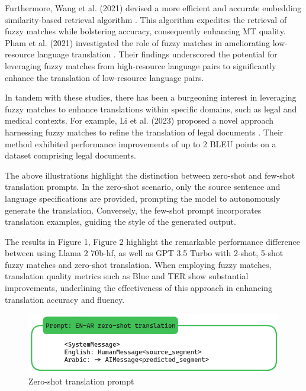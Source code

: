 \documentclass[twocolumn]{article}
\begin{document}
Furthermore, Wang et al. (2021) devised a more efficient and accurate embedding similarity-based retrieval algorithm \cite{wang2021more}. This algorithm expedites the retrieval of fuzzy matches while bolstering accuracy, consequently enhancing MT quality. Pham et al. (2021) investigated the role of fuzzy matches in ameliorating low-resource language translation \cite{pham2021fuzzy}. Their findings underscored the potential for leveraging fuzzy matches from high-resource language pairs to significantly enhance the translation of low-resource language pairs.

In tandem with these studies, there has been a burgeoning interest in leveraging fuzzy matches to enhance translations within specific domains, such as legal and medical contexts. For example, Li et al. (2023) proposed a novel approach harnessing fuzzy matches to refine the translation of legal documents \cite{li2023fuzzy}. Their method exhibited performance improvements of up to 2 BLEU points on a dataset comprising legal documents.

The above illustrations highlight the distinction between zero-shot and few-shot translation prompts. In the zero-shot scenario, only the source sentence and language specifications are provided, prompting the model to autonomously generate the translation. Conversely, the few-shot prompt incorporates translation examples, guiding the style of the generated output.

The results in Figure 1, Figure 2 highlight the remarkable performance difference between using Llama 2 70b-hf, as well as GPT 3.5 Turbo with 2-shot, 5-shot fuzzy matches and zero-shot translation. When employing fuzzy matches, translation quality metrics such as Blue and TER show substantial improvements, underlining the effectiveness of this approach in enhancing translation accuracy and fluency.

\begin{figure}
	\centering
	\includegraphics[width=\linewidth, ]{figs/prompt_zero_shot_translation} %
	\caption{ Zero-shot translation prompt}
	
	\label{fig:duck_863}
\end{figure}
\end{document}
